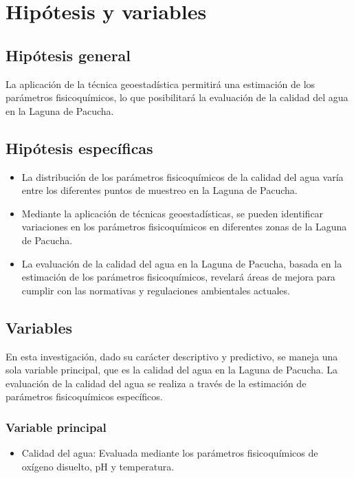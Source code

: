 \section{Hipótesis y variables}

\subsection{Hipótesis general}
La aplicación de la técnica geoestadística permitirá una estimación de los parámetros fisicoquímicos, lo que posibilitará la evaluación de la calidad del agua en la Laguna de Pacucha.
\subsection{Hipótesis específicas}
\begin{itemize}
    \item La distribución de los parámetros fisicoquímicos de la calidad del agua varía entre los diferentes puntos de muestreo en la Laguna de Pacucha.
    \item Mediante la aplicación de técnicas geoestadísticas, se pueden identificar variaciones en los parámetros fisicoquímicos en diferentes zonas de la Laguna de Pacucha.
    \item La evaluación de la calidad del agua en la Laguna de Pacucha, basada en la estimación de los parámetros fisicoquímicos, revelará áreas de mejora para cumplir con las normativas y regulaciones ambientales actuales.
\end{itemize}

\subsection{Variables}

En esta investigación, dado su carácter descriptivo y predictivo, se maneja una sola variable principal, que es la calidad del agua en la Laguna de Pacucha. La evaluación de la calidad del agua se realiza a través de la estimación de parámetros fisicoquímicos específicos.

\subsubsection{Variable principal}
\begin{itemize}
\item Calidad del agua: Evaluada mediante los parámetros fisicoquímicos de oxígeno disuelto, pH y temperatura.
\end{itemize}